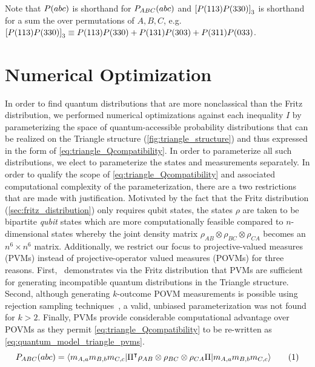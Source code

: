 \documentclass[aps, 10pt, english, twoside, pra, nofootinbib, tightenlines, longbibliography, superscriptaddress]{revtex4-1}
\begin{document}
    Note that $\prob\br{abc}$ is shorthand for $\prob[ABC]\br{abc}$ and $\bs{P(113)P(330)}_3$ is shorthand for a sum the over permutations of $A,B,C$, e.g. $\bs{P(113)P(330)}_3 \defined P(113)P(330) + P(131)P(303) + P(311)P(033)$.


    \section{Numerical Optimization}\label{sec:optimizations}

    In order to find quantum distributions that are more nonclassical than the Fritz distribution, we performed numerical optimizations against each inequality $I$ by parameterizing the space of quantum-accessible probability distributions that can be realized on the Triangle structure (\cref{fig:triangle_structure}) and thus expressed in the form of \cref{eq:triangle_Qcompatibility}. In order to parameterize all such distributions, we elect to parameterize the states and measurements separately. In order to qualify the scope of \cref{eq:triangle_Qcompatibility} and associated computational complexity of the parameterization, there are a two restrictions that are made with justification. Motivated by the fact that the Fritz distribution (\cref{sec:fritz_distribution}) only requires qubit states, the states $\rho$ are taken to be bipartite \textit{qubit} states which are more computationally feasible compared to $n$-dimensional states whereby the joint density matrix $\rho_{AB}\otimes\rho_{BC}\otimes\rho_{CA}$ becomes an $n^6 \times n^6$ matrix. Additionally, we restrict our focus to projective-valued measures (PVMs) instead of projective-operator valued measures (POVMs) for three reasons. First,~\citet{Fritz_2012} demonstrates via the Fritz distribution that PVMs are sufficient for generating incompatible quantum distributions in the Triangle structure. Second, although generating $k$-outcome POVM measurements is possible using rejection sampling techniques~\cite{Petz_2015}, a valid, unbiased parameterization was not found for $k > 2$. Finally, PVMs provide considerable computational advantage over POVMs as they permit \cref{eq:triangle_Qcompatibility} to be re-written as \cref{eq:quantum_model_triangle_pvms}.
    \[ \prob[ABC]\br{abc} = \bramidket{m_{A,a}m_{B,b}m_{C,c}}{\netperm^\intercal \rho_{AB}\otimes\rho_{BC}\otimes\rho_{CA} \netperm}{m_{A,a}m_{B,b}m_{C,c}} \eq \label{eq:quantum_model_triangle_pvms}\]
\end{document}

